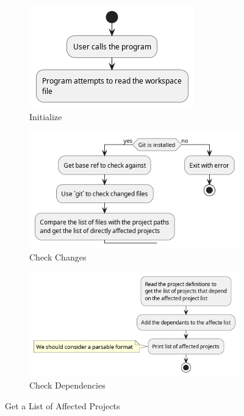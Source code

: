 \documentclass[11pt]{article}
\begin{document}
\begin{figure}[htbp]
  \centering
  \begin{subfigure}{0.35\linewidth}
    \includegraphics[width=\linewidth]{diags/get_affected_activity.png}
    \caption{Initialize}
  \end{subfigure}
  \begin{subfigure}{0.45\linewidth}
    \includegraphics[width=\linewidth]{diags/get_affected_activity_001.png}
    \caption{Check Changes}
  \end{subfigure}
  \begin{subfigure}{0.5\linewidth}
    \includegraphics[width=\linewidth]{diags/get_affected_activity_002.png}
    \caption{Check Dependencies}
  \end{subfigure}
  \caption{\label{fig:act_aff}Get a List of Affected Projects}
\end{figure}
\end{document}
